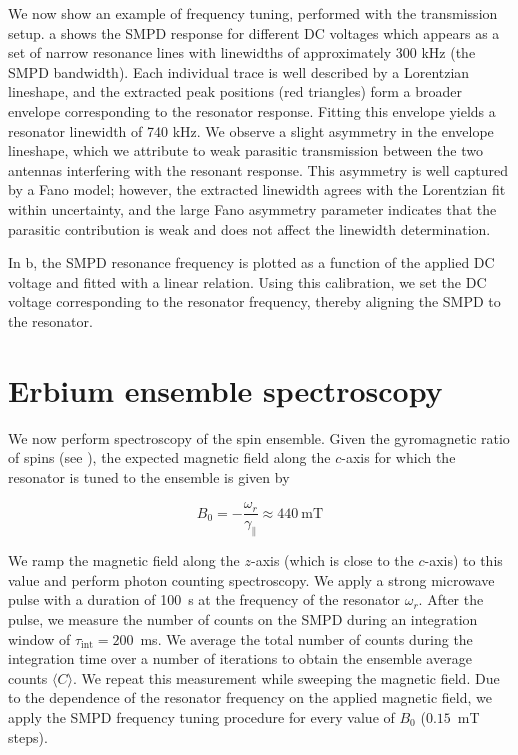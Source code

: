 We now show an example of frequency tuning, performed with the transmission setup. a shows the SMPD response for different DC voltages which appears as a set of narrow resonance lines with linewidths of approximately 300 kHz (the SMPD bandwidth). Each individual trace is well described by a Lorentzian lineshape, and the extracted peak positions (red triangles) form a broader envelope corresponding to the resonator response. Fitting this envelope yields a resonator linewidth of 740 kHz. We observe a slight asymmetry in the envelope lineshape, which we attribute to weak parasitic transmission between the two antennas interfering with the resonant response. This asymmetry is well captured by a Fano model; however, the extracted linewidth agrees with the Lorentzian fit within uncertainty, and the large Fano asymmetry parameter indicates that the parasitic contribution is weak and does not affect the linewidth determination. %

In b, the SMPD resonance frequency is plotted as a function of the applied DC voltage and fitted with a linear relation. Using this calibration, we set the DC voltage corresponding to the resonator frequency, thereby aligning the SMPD to the resonator. 

\section{Erbium ensemble spectroscopy}

We now perform spectroscopy of the \Er spin ensemble. Given the gyromagnetic ratio of \Er spins (see ), the expected magnetic field along the $c$-axis for which the resonator is tuned to the ensemble is given by

\begin{equation}
    B_0 = -\frac{\omega_r}{\gamma_\parallel} \approx 440~\text{mT} 
\end{equation}

We ramp the magnetic field along the $z$-axis (which is close to the $c$-axis) to this value and perform photon counting spectroscopy. We apply a strong microwave pulse with a duration of 100~\textmu s at the frequency of the resonator $\omega_r$. After the pulse, we measure the number of counts on the SMPD during an integration window of $\tau_\text{int}=200$~ms. We average the total number of counts during the integration time over a number of iterations to obtain the ensemble average counts $\langle C \rangle$. We repeat this measurement while sweeping the magnetic field. Due to the dependence of the resonator frequency on the applied magnetic field, we apply the SMPD frequency tuning procedure for every value of $B_0$ ($0.15$~mT steps). 


